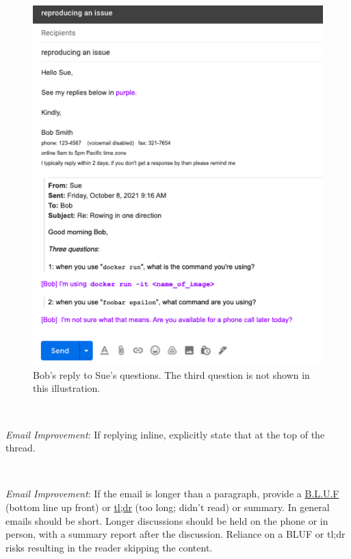 \begin{figure}[H] %
\includegraphics[width=1\textwidth]{images/email_reply.pdf}
\caption{Bob's reply to Sue's questions. The third question is not shown in this illustration.}
\label{fig:email_reply}
\end{figure}

\ \\
\begin{samepage}
\textit{Email Improvement}: If replying inline, explicitly state that at the top of the thread.
\end{samepage}

\ \\
\begin{samepage}
\textit{Email Improvement}: If the email is longer than a paragraph, provide a \href{https://en.wikipedia.org/wiki/BLUF_(communication)}{B.L.U.F}  (bottom line up front)
\iftoggle{WPinmargin}{\marginpar{$>$Wikipedia: BLUF}}{}
or 
\href{https://en.wikipedia.org/wiki/TL;DR}{tl;dr} (too long; didn't read)
or summary. In general emails should be short. Longer discussions should be held on the phone or in person, with a summary report after the discussion. Reliance on a BLUF or tl;dr risks resulting in the reader skipping the content. 
\end{samepage}

